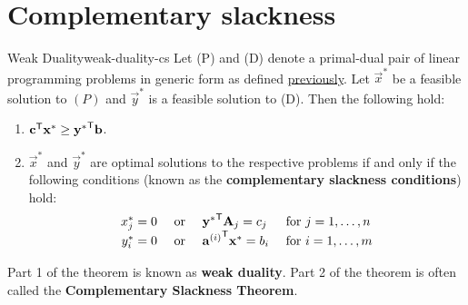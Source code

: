 %
\section{Complementary slackness}\label{complementary-slackness}

\begin{theorem}{Weak Duality}{weak-duality-cs}
\protect\hypertarget{thm:weak-duality-cs}{}{\label{thm:weak-duality-cs}}Let
(P) and (D) denote a primal-dual pair of linear programming problems in
generic form as defined \protect\hyperlink{primal-dual}{previously}. Let
\(\vec{x}^*\) be a feasible solution to \((P)\) and \(\vec{y}^*\) is a
feasible solution to (D). Then the following hold:

\begin{enumerate}
\def\labelenumi{\arabic{enumi}.}
\item
  \(\mathbf{c}^{\mathsf{T}}\mathbf{x}^* \geq \mathbf{y^*}^{\mathsf{T}}\mathbf{b}\).
\item
  \(\vec{x}^*\) and \(\vec{y}^*\) are optimal solutions to the
  respective problems if and only if the following conditions (known as
  the \textbf{complementary slackness conditions}) hold: \[
  \begin{array}{rcll}
  x^*_j = 0 & \mbox{ or } & \mathbf{y^*}^{\mathsf{T}} \mathbf{A}_j = c_j & \mbox{ for }
  j = 1,\ldots, n \\
  y^*_i = 0 & \mbox{ or } & {\mathbf{a}^{(i)}}^{\mathsf{T}} 
  \mathbf{x^*} = b_i & \mbox{ for } i = 1,\ldots, m
  \end{array}
  \]
\end{enumerate}
\end{theorem}

Part 1 of the theorem is known as \textbf{weak duality}. Part 2 of the
theorem is often called the \textbf{Complementary Slackness Theorem}.

